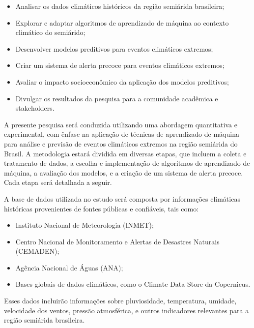 \documentclass{projetodepesquisa} %
\begin{document}
	\begin{itemize}
		\item Analisar os dados climáticos históricos da região semiárida brasileira;
		\item Explorar e adaptar algoritmos de aprendizado de máquina ao contexto climático do semiárido;
		\item Desenvolver modelos preditivos para eventos climáticos extremos;
		\item Criar um sistema de alerta precoce para eventos climáticos extremos;
		\item Avaliar o impacto socioeconômico da aplicação dos modelos preditivos;
		\item Divulgar os resultados da pesquisa para a comunidade acadêmica e stakeholders.
	\end{itemize}

	\label{sec:metodologia}
	
	A presente pesquisa será conduzida utilizando uma abordagem quantitativa e experimental, com ênfase na aplicação de técnicas de aprendizado de máquina para análise e previsão de eventos climáticos extremos na região semiárida do Brasil. A metodologia estará dividida em diversas etapas, que incluem a coleta e tratamento de dados, a escolha e implementação de algoritmos de aprendizado de máquina, a avaliação dos modelos, e a criação de um sistema de alerta precoce. Cada etapa será detalhada a seguir.
	
	\label{sec:coleta_tratamento_dados}
	\label{sec:fontes_dados_climaticos}
	A base de dados utilizada no estudo será composta por informações climáticas históricas provenientes de fontes públicas e confiáveis, tais como:
	
	\begin{itemize}
		\item Instituto Nacional de Meteorologia (INMET);
		\item Centro Nacional de Monitoramento e Alertas de Desastres Naturais (CEMADEN);
		\item Agência Nacional de Águas (ANA);
		\item Bases globais de dados climáticos, como o Climate Data Store da Copernicus.
	\end{itemize}
	
	Esses dados incluirão informações sobre pluviosidade, temperatura, umidade, velocidade dos ventos, pressão atmosférica, e outros indicadores relevantes para a região semiárida brasileira.
	
\end{document}
